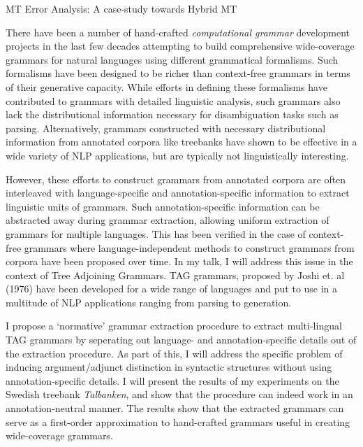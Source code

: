 \documentclass[a4paper, 11pt]{article}
\begin{document}
\pagestyle{fancy}
\lhead{\textcolor{gray}{Prasanth Kolachina}}
\chead{\textcolor{gray}{}}
\rhead{\textcolor{gray}{REMU}}
\lfoot{\textcolor{gray}{prasanth.kolachina@cse.gu.se}}
\rfoot{\thepage}
\renewcommand{\headrulewidth}{0.5pt} 
\renewcommand{\footrulewidth}{0.5pt} 
\fancyfoot[C]{\footnotesize \textcolor{gray}{}} 

\centerline{ {\Large MT Error Analysis: A case-study towards Hybrid MT} }
\vspace*{1cm}

There have been a number of hand-crafted \textit{computational grammar} development projects in the last
few decades attempting to build comprehensive wide-coverage grammars for natural languages using different
grammatical formalisms. Such formalisms have been designed to be richer than context-free grammars
in terms of their generative capacity. While efforts in defining these formalisms have contributed
to grammars with detailed linguistic analysis, such grammars also lack the distributional information
necessary for disambiguation tasks such as parsing. Alternatively, grammars constructed with necessary 
distributional information from annotated corpora like treebanks have shown to be effective in a wide 
variety of NLP applications, but are typically not linguistically interesting. 

However, these efforts to construct grammars from annotated corpora are often interleaved with 
language-specific and annotation-specific information to extract linguistic units of grammars. Such
annotation-specific information can be abstracted away during grammar extraction, allowing uniform
extraction of grammars for multiple languages. This has been verified in the case of context-free grammars
where language-independent methods to construct grammars from corpora have been proposed over time.
In my talk, I will address this issue in the context of Tree Adjoining Grammars. TAG grammars, proposed by
Joshi et. al (1976) have been developed for a wide range of languages and put to use in a multitude of
NLP applications ranging from parsing to generation.

I propose a `normative' grammar extraction procedure to extract multi-lingual TAG grammars by seperating out
language- and annotation-specific details out of the extraction procedure. As part of this, I will address
the specific problem of inducing argument/adjunct distinction in syntactic structures without
using annotation-specific details. I will present the results of my experiments on the Swedish treebank
\textit{Talbanken}, and show that the procedure can indeed work in an annotation-neutral manner. The results
show that the extracted grammars can serve as a first-order approximation to hand-crafted grammars useful
in creating wide-coverage grammars. 

%
%
\end{document}
